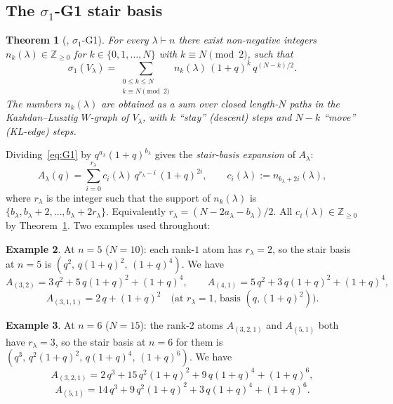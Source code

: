 \documentclass[11pt]{article}
\theoremstyle{plain}
\newtheorem{theorem}{Theorem}
\theoremstyle{definition}
\newtheorem{example}[theorem]{Example}
\theoremstyle{remark}
\newcommand{\Z}{\mathbb{Z}}
\newcommand{\Vlam}{V_\lambda}
\begin{document}
\subsection{The $\sigma_1$-G1 stair basis}

\begin{theorem}[\cite{Apr24}, $\sigma_1$-G1]\label{thm:G1}
For every $\lambda \vdash n$ there exist non-negative integers $n_k(\lambda)
\in \Z_{\geq 0}$ for $k \in \{0,1,\ldots,N\}$ with $k \equiv N \pmod 2$, such that
\begin{equation}
\sigma_1(\Vlam) = \sum_{\substack{0 \leq k \leq N \\ k \equiv N \!\!\!\!\pmod 2}}
n_k(\lambda)\,(1+q)^k\,q^{(N-k)/2}.
\label{eq:G1}
\end{equation}
The numbers $n_k(\lambda)$ are obtained as a sum over closed length-$N$ paths in
the Kazhdan--Lusztig $W$-graph of $\Vlam$, with $k$ ``stay'' (descent) steps and
$N-k$ ``move'' (KL-edge) steps.
\end{theorem}

Dividing~\eqref{eq:G1} by $q^{a_\lambda}(1+q)^{b_\lambda}$ gives the
\emph{stair-basis expansion} of $A_\lambda$:
\begin{equation}
A_\lambda(q) = \sum_{i=0}^{r_\lambda} c_i(\lambda)\,
   q^{r_\lambda-i}\,(1+q)^{2i},
\qquad c_i(\lambda) := n_{b_\lambda + 2i}(\lambda),
\label{eq:stairA}
\end{equation}
where $r_\lambda$ is the integer such that the support of $n_k(\lambda)$ is
$\{b_\lambda, b_\lambda + 2, \ldots, b_\lambda + 2 r_\lambda\}$.  Equivalently
$r_\lambda = (N - 2 a_\lambda - b_\lambda)/2$.  All $c_i(\lambda) \in
\Z_{\geq 0}$ by Theorem~\ref{thm:G1}.  Two examples used throughout:

\begin{example}\label{ex:n5basis}
At $n = 5$ ($N = 10$): each rank-$1$ atom has $r_\lambda = 2$, so the stair
basis at $n=5$ is $(q^2,\, q(1+q)^2,\, (1+q)^4)$.  We have
\[
A_{(3,2)} = 3\,q^2 + 5\,q(1+q)^2 + (1+q)^4, \qquad
A_{(4,1)} = 5\,q^2 + 3\,q(1+q)^2 + (1+q)^4,
\]
\[
A_{(3,1,1)} = 2\,q + (1+q)^2 \quad \text{(at $r_\lambda = 1$, basis $(q,(1+q)^2)$).}
\]
\end{example}

\begin{example}\label{ex:n6basis}
At $n = 6$ ($N = 15$): the rank-$2$ atoms $A_{(3,2,1)}$ and $A_{(5,1)}$ both
have $r_\lambda = 3$, so the stair basis at $n=6$ for them is
$(q^3,\, q^2(1+q)^2,\, q(1+q)^4,\, (1+q)^6)$.  We have
\[
A_{(3,2,1)} = 2\,q^3 + 15\,q^2(1+q)^2 + 9\,q(1+q)^4 + (1+q)^6,
\]
\[
A_{(5,1)} = 14\,q^3 + 9\,q^2(1+q)^2 + 3\,q(1+q)^4 + (1+q)^6.
\]
\end{example}
\end{document}
